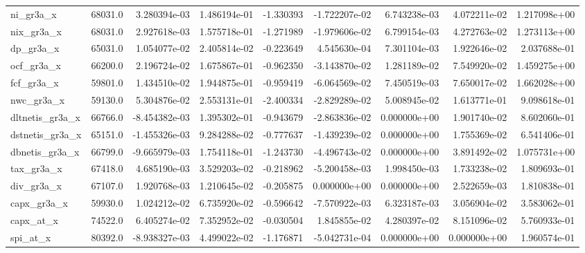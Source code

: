 \documentclass[10pt]{article}
\begin{document}
\begin{landscape}
\begin{longtable}{lrrrrrrrr}
ni\_gr3a\_x               &   68031.0 &  3.280394e-03 &  1.486194e-01 &     -1.330393 & -1.722207e-02 &  6.743238e-03 &  4.072211e-02 &  1.217098e+00 \\
nix\_gr3a\_x              &   68031.0 &  2.927618e-03 &  1.575718e-01 &     -1.271989 & -1.979606e-02 &  6.799154e-03 &  4.272763e-02 &  1.273113e+00 \\
dp\_gr3a\_x               &   65031.0 &  1.054077e-02 &  2.405814e-02 &     -0.223649 &  4.545630e-04 &  7.301104e-03 &  1.922646e-02 &  2.037688e-01 \\
ocf\_gr3a\_x              &   66200.0 &  2.196724e-02 &  1.675867e-01 &     -0.962350 & -3.143870e-02 &  1.281189e-02 &  7.549920e-02 &  1.459275e+00 \\
fcf\_gr3a\_x              &   59801.0 &  1.434510e-02 &  1.944875e-01 &     -0.959419 & -6.064569e-02 &  7.450519e-03 &  7.650017e-02 &  1.662028e+00 \\
nwc\_gr3a\_x              &   59130.0 &  5.304876e-02 &  2.553131e-01 &     -2.400334 & -2.829289e-02 &  5.008945e-02 &  1.613771e-01 &  9.098618e-01 \\
dltnetis\_gr3a\_x         &   66766.0 & -8.454382e-03 &  1.395302e-01 &     -0.943679 & -2.863836e-02 &  0.000000e+00 &  1.901740e-02 &  8.602060e-01 \\
dstnetis\_gr3a\_x         &   65151.0 & -1.455326e-03 &  9.284288e-02 &     -0.777637 & -1.439239e-02 &  0.000000e+00 &  1.755369e-02 &  6.541406e-01 \\
dbnetis\_gr3a\_x          &   66799.0 & -9.665979e-03 &  1.754118e-01 &     -1.243730 & -4.496743e-02 &  0.000000e+00 &  3.891492e-02 &  1.075731e+00 \\
tax\_gr3a\_x              &   67418.0 &  4.685190e-03 &  3.529203e-02 &     -0.218962 & -5.200458e-03 &  1.998450e-03 &  1.733238e-02 &  1.809693e-01 \\
div\_gr3a\_x              &   67107.0 &  1.920768e-03 &  1.210645e-02 &     -0.205875 &  0.000000e+00 &  0.000000e+00 &  2.522659e-03 &  1.810838e-01 \\
capx\_gr3a\_x             &   59930.0 &  1.024212e-02 &  6.735920e-02 &     -0.596642 & -7.570922e-03 &  6.323187e-03 &  3.056904e-02 &  3.583062e-01 \\
capx\_at\_x               &   74522.0 &  6.405274e-02 &  7.352952e-02 &     -0.030504 &  1.845855e-02 &  4.280397e-02 &  8.151096e-02 &  5.760933e-01 \\
spi\_at\_x                &   80392.0 & -8.938327e-03 &  4.499022e-02 &     -1.176871 & -5.042731e-04 &  0.000000e+00 &  0.000000e+00 &  1.960574e-01 \\

\end{longtable}
\end{landscape}
\end{document}
